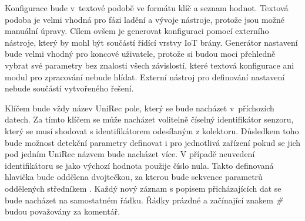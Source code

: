  Konfigurace bude v~textové podobě ve formátu klíč a seznam hodnot. Textová podoba je velmi vhodná pro 
 fázi ladění a vývoje nástroje, protože jsou možné manuální úpravy. Cílem ovšem je generovat 
 konfiguraci pomocí externího nástroje, který by mohl být součástí řídící vrstvy IoT brány. Generátor
 nastavení bude velmi vhodný pro koncové uživatele, protože si budou moci přehledně vybrat své
 parametry bez znalosti všech závislostí, které textová konfigurace ani modul pro zpracování 
 nebude hlídat. Externí nástroj pro definování nastavení nebude součástí vytvořeného řešení.
 
 Klíčem bude vždy název UniRec pole, který se bude nacházet v~příchozích datech. Za tímto klíčem
 se může nacházet volitelně číselný identifikátor senzoru, který se musí shodovat s 
 identifikátorem odesílaným z kolektoru. Důsledkem toho bude možnost detekční parametry
 definovat i pro jednotlivá zařízení pokud se jich pod jedním UniRec názvem bude nacházet 
 více. V případě neuvedení identifikátoru se jako výchozí hodnota použije číslo nula.
 Takto definovaná hlavička bude oddělena dvojtečkou, za kterou bude sekvence parametrů
 oddělených středníkem . Každý nový záznam s popisem přicházajících dat
 se bude nacházet na samostatném řádku. Řádky prázdné a začínající znakem \textit{\#} budou
 považovány za komentář. 
 
